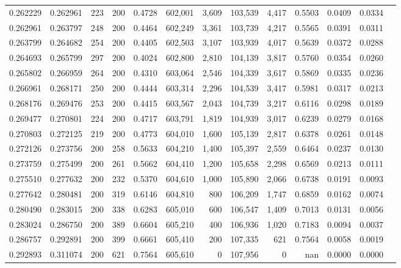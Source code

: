\begin{tabular}{rrrrrrrrrrrrr}
0.262229 & 0.262961 &    223 & 200 &                                     0.4728 & 602,001 &   3,609 & 103,539 &   4,417 & 0.5503 & 0.0409 & 0.0334 \\
0.262961 & 0.263797 &    248 & 200 &                                     0.4464 & 602,249 &   3,361 & 103,739 &   4,217 & 0.5565 & 0.0391 & 0.0311 \\
0.263799 & 0.264682 &    254 & 200 &                                     0.4405 & 602,503 &   3,107 & 103,939 &   4,017 & 0.5639 & 0.0372 & 0.0288 \\
0.264693 & 0.265799 &    297 & 200 &                                     0.4024 & 602,800 &   2,810 & 104,139 &   3,817 & 0.5760 & 0.0354 & 0.0260 \\
0.265802 & 0.266959 &    264 & 200 &                                     0.4310 & 603,064 &   2,546 & 104,339 &   3,617 & 0.5869 & 0.0335 & 0.0236 \\
0.266961 & 0.268171 &    250 & 200 &                                     0.4444 & 603,314 &   2,296 & 104,539 &   3,417 & 0.5981 & 0.0317 & 0.0213 \\
0.268176 & 0.269476 &    253 & 200 &                                     0.4415 & 603,567 &   2,043 & 104,739 &   3,217 & 0.6116 & 0.0298 & 0.0189 \\
0.269477 & 0.270801 &    224 & 200 &                                     0.4717 & 603,791 &   1,819 & 104,939 &   3,017 & 0.6239 & 0.0279 & 0.0168 \\
0.270803 & 0.272125 &    219 & 200 &                                     0.4773 & 604,010 &   1,600 & 105,139 &   2,817 & 0.6378 & 0.0261 & 0.0148 \\
0.272126 & 0.273756 &    200 & 258 &                                     0.5633 & 604,210 &   1,400 & 105,397 &   2,559 & 0.6464 & 0.0237 & 0.0130 \\
0.273759 & 0.275499 &    200 & 261 &                                     0.5662 & 604,410 &   1,200 & 105,658 &   2,298 & 0.6569 & 0.0213 & 0.0111 \\
0.275510 & 0.277632 &    200 & 232 &                                     0.5370 & 604,610 &   1,000 & 105,890 &   2,066 & 0.6738 & 0.0191 & 0.0093 \\
0.277642 & 0.280481 &    200 & 319 &                                     0.6146 & 604,810 &     800 & 106,209 &   1,747 & 0.6859 & 0.0162 & 0.0074 \\
0.280490 & 0.283015 &    200 & 338 &                                     0.6283 & 605,010 &     600 & 106,547 &   1,409 & 0.7013 & 0.0131 & 0.0056 \\
0.283024 & 0.286750 &    200 & 389 &                                     0.6604 & 605,210 &     400 & 106,936 &   1,020 & 0.7183 & 0.0094 & 0.0037 \\
0.286757 & 0.292891 &    200 & 399 &                                     0.6661 & 605,410 &     200 & 107,335 &     621 & 0.7564 & 0.0058 & 0.0019 \\
0.292893 & 0.311074 &    200 & 621 &                                     0.7564 & 605,610 &       0 & 107,956 &       0 &    nan & 0.0000 & 0.0000 \\
\bottomrule
\end{tabular}
